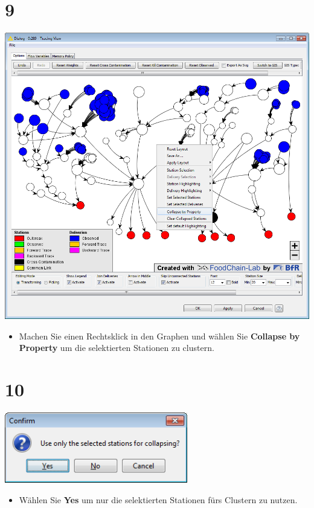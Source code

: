 \documentclass{beamer}
\begin{document}
\section{9}
\begin{frame}
	\begin{center}
  		\includegraphics[height=0.6\textheight]{9.png}
	\end{center}
	\begin{itemize}
		\item Machen Sie einen Rechtsklick in den Graphen und wählen Sie \textbf{Collapse by Property} um die selektierten Stationen zu clustern.
	\end{itemize}
\end{frame}

\section{10}
\begin{frame}
	\begin{center}
  		\includegraphics[width=0.6\textwidth]{10.png}
	\end{center}
	\begin{itemize}
		\item Wählen Sie \textbf{Yes} um nur die selektierten Stationen fürs Clustern zu nutzen.
	\end{itemize}
\end{frame}
\end{document}
